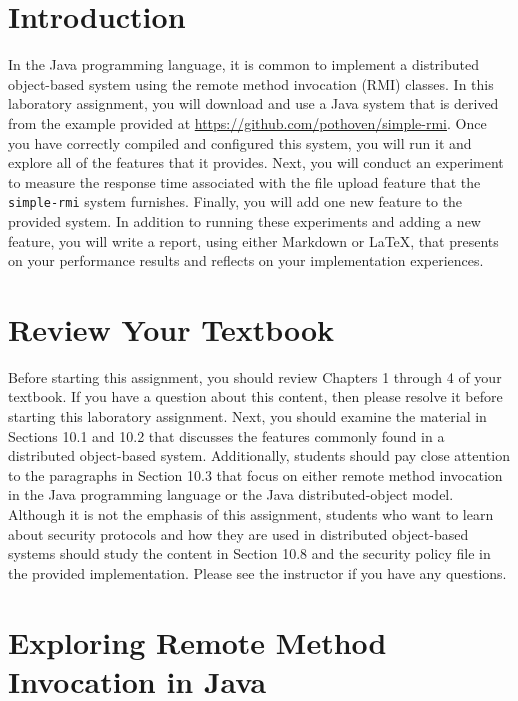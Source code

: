 

\usepackage[compact]{titlesec}



\section*{Introduction}

In the Java programming language, it is common to implement a distributed object-based system using the remote method
invocation (RMI) classes. In this laboratory assignment, you will download and use a Java system that is derived from
the example provided at \url{https://github.com/pothoven/simple-rmi}. Once you have correctly compiled and configured
this system, you will run it and explore all of the features that it provides. Next, you will conduct an experiment to
measure the response time associated with the file upload feature that the {\tt simple-rmi} system furnishes. Finally,
you will add one new feature to the provided system. In addition to running these experiments and adding a new feature,
you will write a report, using either Markdown or \LaTeX, that presents on your performance results and reflects on your
implementation experiences.

\section*{Review Your Textbook}

Before starting this assignment, you should review Chapters 1 through 4 of your textbook. If you have a question about
this content, then please resolve it before starting this laboratory assignment. Next, you should examine the material
in Sections 10.1 and 10.2 that discusses the features commonly found in a distributed object-based system. Additionally,
students should pay close attention to the paragraphs in Section 10.3 that focus on either remote method invocation in the Java
programming language or the Java distributed-object model. Although it is not the emphasis of this assignment, students
who want to learn about security protocols and how they are used in distributed object-based systems should study the
content in Section 10.8 and the security policy file in the provided implementation.  Please see the instructor if you
have any questions.

\section*{Exploring Remote Method Invocation in Java}

